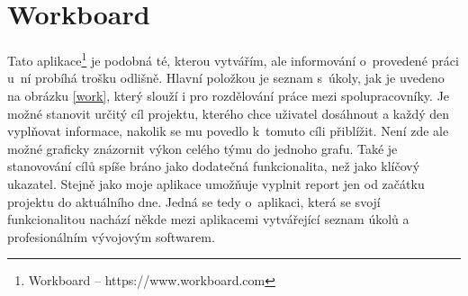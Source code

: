 \section{Workboard}

Tato aplikace\footnote{Workboard -- https://www.workboard.com} je podobná té, kterou vytvářím, ale informování o~provedené práci u~ní probíhá trošku odlišně. Hlavní položkou je seznam s~úkoly, jak je uvedeno na obrázku \ref{work}, který slouží i pro rozdělování práce mezi spolupracovníky. Je možné stanovit určitý cíl projektu, kterého chce uživatel dosáhnout a každý den vyplňovat informace, nakolik se mu povedlo k~tomuto cíli přiblížit. Není zde ale možné graficky znázornit výkon celého týmu do jednoho grafu. Také je stanovování cílů spíše bráno jako dodatečná funkcionalita, než jako klíčový ukazatel. Stejně jako moje aplikace umožňuje vyplnit report jen od začátku projektu do aktuálního dne. Jedná se tedy o~aplikaci, která se svojí funkcionalitou nachází někde mezi aplikacemi vytvářející seznam úkolů a profesionálním vývojovým softwarem. 

